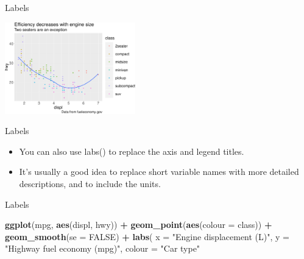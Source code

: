 \documentclass[ignorenonframetext,]{beamer}
\newenvironment{Shaded}{\begin{snugshade}}{\end{snugshade}}
\newcommand{\DataTypeTok}[1]{\textcolor[rgb]{0.13,0.29,0.53}{#1}}
\newcommand{\KeywordTok}[1]{\textcolor[rgb]{0.13,0.29,0.53}{\textbf{#1}}}
\newcommand{\NormalTok}[1]{#1}
\newcommand{\OperatorTok}[1]{\textcolor[rgb]{0.81,0.36,0.00}{\textbf{#1}}}
\newcommand{\OtherTok}[1]{\textcolor[rgb]{0.56,0.35,0.01}{#1}}
\newcommand{\StringTok}[1]{\textcolor[rgb]{0.31,0.60,0.02}{#1}}
\begin{document}
\begin{frame}{Labels}
\protect\hypertarget{labels-3}{}

\begin{center}\includegraphics[height=150px]{data-visualization_files/figure-beamer/unnamed-chunk-150-1} \end{center}

\end{frame}

\begin{frame}{Labels}
\protect\hypertarget{labels-4}{}

\begin{itemize}
\item
  You can also use labs() to replace the axis and legend titles.
\item
  It's usually a good idea to replace short variable names with more
  detailed descriptions, and to include the units.
\end{itemize}

\end{frame}

\begin{frame}[fragile]{Labels}
\protect\hypertarget{labels-5}{}

\begin{Shaded}
\begin{Highlighting}[]
\KeywordTok{ggplot}\NormalTok{(mpg, }\KeywordTok{aes}\NormalTok{(displ, hwy)) }\OperatorTok{+}
\StringTok{  }\KeywordTok{geom_point}\NormalTok{(}\KeywordTok{aes}\NormalTok{(}\DataTypeTok{colour =}\NormalTok{ class)) }\OperatorTok{+}
\StringTok{  }\KeywordTok{geom_smooth}\NormalTok{(}\DataTypeTok{se =} \OtherTok{FALSE}\NormalTok{) }\OperatorTok{+}
\StringTok{  }\KeywordTok{labs}\NormalTok{(}
    \DataTypeTok{x =} \StringTok{"Engine displacement (L)"}\NormalTok{,}
    \DataTypeTok{y =} \StringTok{"Highway fuel economy (mpg)"}\NormalTok{,}
    \DataTypeTok{colour =} \StringTok{"Car type"}
\end{Highlighting}
\end{Shaded}

\end{frame}
\end{document}
